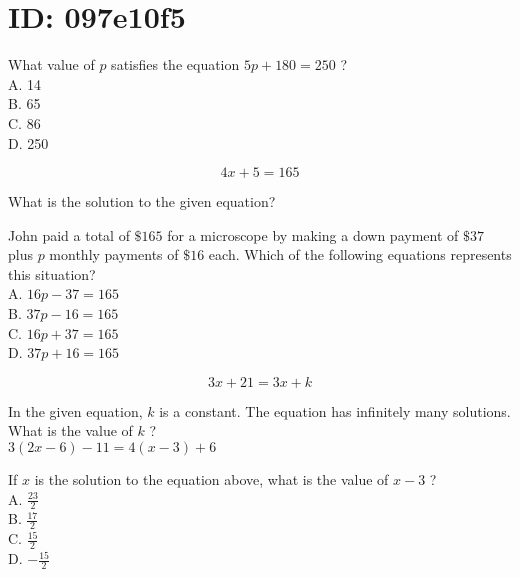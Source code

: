 \section*{ID: 097e10f5}
What value of $p$ satisfies the equation $5 p+180=250$ ?\\
A. 14\\
B. 65\\
C. 86\\
D. 250








$$
4 x+5=165
$$

What is the solution to the given equation?








John paid a total of $\$ 165$ for a microscope by making a down payment of $\$ 37$ plus $p$ monthly payments of $\$ 16$ each. Which of the following equations represents this situation?\\
A. $16 p-37=165$\\
B. $37 p-16=165$\\
C. $16 p+37=165$\\
D. $37 p+16=165$










$$
3 x+21=3 x+k
$$

In the given equation, $k$ is a constant. The equation has infinitely 
many solutions. What is the value of $k$ ?\\










$3(2 x-6)-11=4(x-3)+6$

If $x$ is the solution to the equation above, what is the value of $x-3$ ?\\
A. $\frac{23}{2}$\\
B. $\frac{17}{2}$\\
C. $\frac{15}{2}$\\
D. $-\frac{15}{2}$







